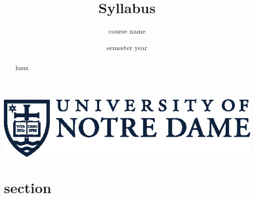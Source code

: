 




\title{Syllabus}
\author[Daniel Gonzalez Cedre]{course name}
\date{semester year}



\maketitle

\begin{marginfigure}[-39ex]
  \includegraphics[width=\textwidth]{figures/nd-academic-mark.eps}
\end{marginfigure}

\begin{abstract}
  hmm
\end{abstract}

{\hypersetup{hidelinks}\tableofcontents}
\newpage

\section{section}


